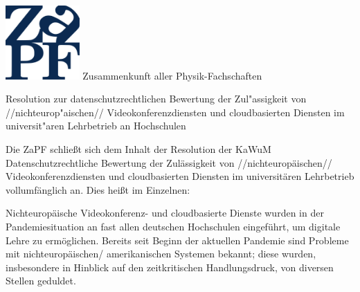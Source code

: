 \documentclass[DIV=calc]{scrartcl}
\let\oldgrqq=\grqq
\def\grqq{\oldgrqq\xspace}
\begin{document}
\hspace{0.87\textwidth}
\begin{minipage}{120pt}
	\vspace{-1.8cm}
	\includegraphics[width=80pt]{../logo.pdf}
	\centering
	\small Zusammenkunft aller Physik-Fachschaften
\end{minipage}

\begin{center}
  \huge{Resolution zur datenschutzrechtlichen Bewertung der Zul"assigkeit von //nichteurop"aischen// Videokonferenzdiensten und cloudbasierten Diensten im universit"aren Lehrbetrieb an Hochschulen}\vspace{.25\baselineskip}\\
  \normalsize
\end{center}
\vspace{1cm}





Die ZaPF schließt sich dem Inhalt der Resolution der KaWuM \glqq Datenschutzrechtliche Bewertung der Zulässigkeit von //nichteuropäischen// Videokonferenzdiensten und cloudbasierten Diensten im universitären Lehrbetrieb\grqq vollumfänglich an. Dies heißt im Einzelnen: 

Nichteuropäische Videokonferenz- und cloudbasierte Dienste wurden in der Pandemiesituation an fast allen deutschen Hochschulen eingeführt, um digitale Lehre zu ermöglichen. Bereits seit Beginn der aktuellen Pandemie sind Probleme mit nichteuropäischen/ amerikanischen Systemen bekannt; diese wurden, insbesondere in Hinblick auf den zeitkritischen Handlungsdruck, von diversen Stellen geduldet. 
\end{document}
